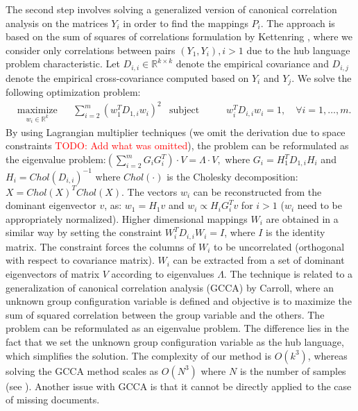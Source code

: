 \documentclass[twoside,11pt]{article}
\newcommand{\todo}[1]{\textcolor{red}{TODO: #1}}
\newcommand{\RR}{\mathbb{R}}
\begin{document}
The second step involves solving a generalized version of canonical correlation analysis on the matrices $Y_i$ in order to find the mappings $P_i$. The approach is based on the sum of squares of correlations formulation by Kettenring \cite{Kettenring}, where we consider only correlations between pairs $(Y_1, Y_i), i >1$ due to the hub language problem characteristic. Let $D_{i,i} \in \RR^{k \times k}$ denote the empirical covariance and $D_{i,j}$ denote the empirical cross-covariance computed based on $Y_i$ and $Y_j$. We solve the following optimization problem:
\begin{equation*}
  \begin{aligned}
    & \underset{w_i \in \RR^{k}}{\text{maximize}}
    & & \sum_{i = 2}^m  \left(w_1^T D_{1,i} w_i \right)^2
    & \text{subject to}
    & & w_i^T D_{i,i} w_i = 1, \quad\forall i = 1,\ldots, m.
\end{aligned}
\end{equation*}
By using Lagrangian multiplier techniques (we omit the derivation due to space constraints \todo{Add what was omitted}), the problem can be reformulated as the eigenvalue problem:$\left(\sum_{i=2}^m G_i G_i^T\right) \cdot V = \Lambda \cdot V,$ where $G_i = H_1^T D_{1,i} H_i$ and $H_i = Chol(D_{i,i})^{-1}$ where $Chol(\cdot)$ is the Cholesky decomposition: $X = Chol(X)^T Chol(X)$. The vectors $w_i$ can be reconstructed from the dominant eigenvector $v$, as: $w_1 = H_1 v$  and $w_i \propto H_i  G_i^T  v$ for $i >1$ ($w_i$ need to be appropriately normalized). Higher dimensional mappings $W_i$ are obtained in a similar way by setting the constraint $W_i^T D_{i,i} W_i = I$, where $I$ is the identity matrix. The constraint forces the columns of $W_i$ to be uncorrelated (orthogonal with respect to covariance matrix). $W_i$ can be extracted from a set of dominant eigenvectors of matrix $V$ according to eigenvalues $\Lambda$. The technique is related to a generalization of canonical correlation analysis (GCCA) by Carroll\cite{Carroll}, where an unknown group configuration variable is defined and objective is to maximize the sum of squared correlation between the group variable and the others. The problem can be reformulated as an eigenvalue problem. The difference lies in the fact that we set the unknown group configuration variable as the hub language, which simplifies the solution. The complexity of our method is $O(k^3)$, whereas solving the GCCA method scales as $O(N^3)$ where $N$ is the number of samples (see \cite{gifi}). Another issue with GCCA is that it cannot be directly applied to the case of missing documents.
\end{document}
